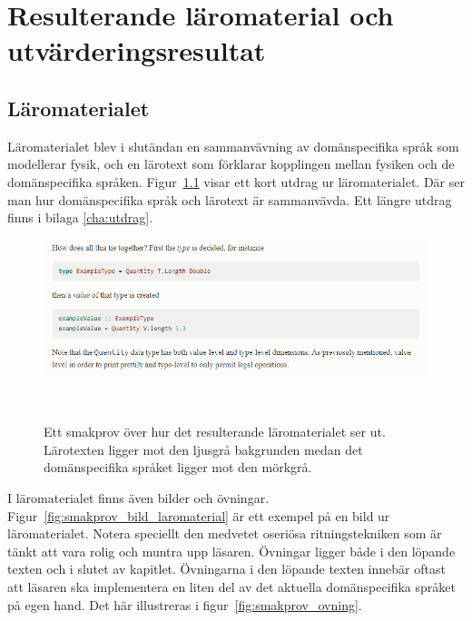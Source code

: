 
\chapter{Resulterande läromaterial och utvärderingsresultat}

\begin{draft}

\section{Läromaterialet}

Läromaterialet blev i slutändan en sammanvävning av domänspecifika språk som
modellerar fysik, och en lärotext som förklarar kopplingen mellan fysiken och de
domänspecifika språken. Figur~\ref{fig:smakprov_laromaterial} visar ett kort
utdrag ur läromaterialet. Där ser man hur domänspecifika språk och lärotext är
sammanvävda. Ett längre utdrag finns i bilaga \ref{cha:utdrag}.

\begin{figure}[tph]
  \includegraphics[width=\linewidth]{figure/smakprov_laromaterial.png}
  \caption{Ett smakprov över hur det resulterande läromaterialet ser ut.
           Lärotexten ligger mot den ljusgrå bakgrunden medan det
           domänspecifika språket ligger mot den
           mörkgrå.}~\label{fig:smakprov_laromaterial} 
\end{figure}

I läromaterialet finns även bilder och övningar. Figur~\ref{fig:smakprov_bild_laromaterial} är ett exempel på en bild ur läromaterialet. Notera speciellt den medvetet oseriösa ritningstekniken som är tänkt att vara rolig och muntra upp läsaren. Övningar ligger både i den löpande texten och i slutet av kapitlet. Övningarna i den löpande texten innebär oftast att läsaren ska implementera en liten del av det aktuella domänspecifika språket på egen hand. Det här illustreras i figur~\ref{fig:smakprov_ovning}.


\end{draft}
